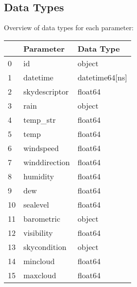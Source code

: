 \subsection{Data Types}
Overview of data types for each parameter:
\begin{tabular}{lll}
\toprule
 & Parameter & Data Type \\
\midrule
0 & id & object \\
1 & datetime & datetime64[ns] \\
2 & skydescriptor & float64 \\
3 & rain & object \\
4 & temp_str & float64 \\
5 & temp & float64 \\
6 & windspeed & float64 \\
7 & winddirection & float64 \\
8 & humidity & float64 \\
9 & dew & float64 \\
10 & sealevel & float64 \\
11 & barometric & object \\
12 & visibility & float64 \\
13 & skycondition & object \\
14 & mincloud & float64 \\
15 & maxcloud & float64 \\
\bottomrule
\end{tabular}

